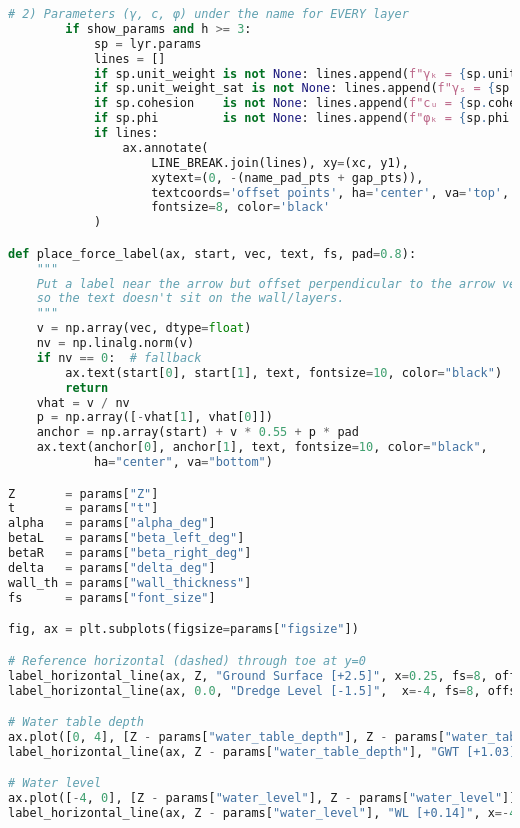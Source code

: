 \begin{lstlisting}[language=Python]
    # 2) Parameters (γ, c, φ) under the name for EVERY layer
        if show_params and h >= 3:
            sp = lyr.params
            lines = []
            if sp.unit_weight is not None: lines.append(f"γₖ = {sp.unit_weight:g} kN/m³")
            if sp.unit_weight_sat is not None: lines.append(f"γₛ = {sp.unit_weight_sat:g} kN/m³")
            if sp.cohesion    is not None: lines.append(f"cᵤ = {sp.cohesion:g} kPa")
            if sp.phi         is not None: lines.append(f"φₖ = {sp.phi:g}°")
            if lines:
                ax.annotate(
                    LINE_BREAK.join(lines), xy=(xc, y1),
                    xytext=(0, -(name_pad_pts + gap_pts)),
                    textcoords='offset points', ha='center', va='top',
                    fontsize=8, color='black'
            )

def place_force_label(ax, start, vec, text, fs, pad=0.8):
    """
    Put a label near the arrow but offset perpendicular to the arrow vector
    so the text doesn't sit on the wall/layers.
    """
    v = np.array(vec, dtype=float)
    nv = np.linalg.norm(v)
    if nv == 0:  # fallback
        ax.text(start[0], start[1], text, fontsize=10, color="black")
        return
    vhat = v / nv
    p = np.array([-vhat[1], vhat[0]])
    anchor = np.array(start) + v * 0.55 + p * pad
    ax.text(anchor[0], anchor[1], text, fontsize=10, color="black",
            ha="center", va="bottom")

Z       = params["Z"]
t       = params["t"]
alpha   = params["alpha_deg"]
betaL   = params["beta_left_deg"]
betaR   = params["beta_right_deg"]
delta   = params["delta_deg"]
wall_th = params["wall_thickness"]
fs      = params["font_size"]

fig, ax = plt.subplots(figsize=params["figsize"])

# Reference horizontal (dashed) through toe at y=0
label_horizontal_line(ax, Z, "Ground Surface [+2.5]", x=0.25, fs=8, offset_pts=6)
label_horizontal_line(ax, 0.0, "Dredge Level [-1.5]",  x=-4, fs=8, offset_pts=6)

# Water table depth
ax.plot([0, 4], [Z - params["water_table_depth"], Z - params["water_table_depth"]], linestyle="--", linewidth=1.5, color="black")
label_horizontal_line(ax, Z - params["water_table_depth"], "GWT [+1.03]", x=0.25, fs=8, offset_pts=6)

# Water level
ax.plot([-4, 0], [Z - params["water_level"], Z - params["water_level"]], linestyle="--", linewidth=1.5, color="black")
label_horizontal_line(ax, Z - params["water_level"], "WL [+0.14]", x=-4, fs=8, offset_pts=6)


\end{lstlisting}
